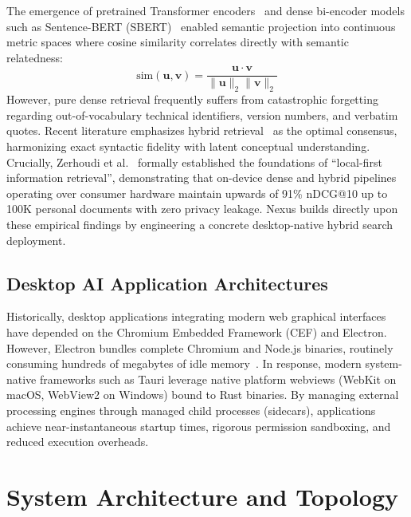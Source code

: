 \documentclass[pdflatex,sn-mathphys-num]{sn-jnl}%
\theoremstyle{thmstyleone}%
\theoremstyle{thmstyletwo}%
\theoremstyle{thmstylethree}%
\begin{document}
The emergence of pretrained Transformer encoders~\cite{devlin2018bert} and dense bi-encoder models such as Sentence-BERT (SBERT)~\cite{reimers2019sentence} enabled semantic projection into continuous metric spaces where cosine similarity correlates directly with semantic relatedness:
\begin{equation}
\text{sim}(\mathbf{u}, \mathbf{v}) = \frac{\mathbf{u} \cdot \mathbf{v}}{\|\mathbf{u}\|_2 \|\mathbf{v}\|_2}\label{eq_cosine}
\end{equation}
However, pure dense retrieval frequently suffers from catastrophic forgetting regarding out-of-vocabulary technical identifiers, version numbers, and verbatim quotes. Recent literature emphasizes hybrid retrieval~\cite{karpukhin2020dense,lin2021pretrained} as the optimal consensus, harmonizing exact syntactic fidelity with latent conceptual understanding. Crucially, Zerhoudi et al.~\cite{zerhoudi2026aswemaysearch} formally established the foundations of ``local-first information retrieval'', demonstrating that on-device dense and hybrid pipelines operating over consumer hardware maintain upwards of 91\% nDCG@10 up to 100K personal documents with zero privacy leakage. Nexus builds directly upon these empirical findings by engineering a concrete desktop-native hybrid search deployment.

\subsection{Desktop AI Application Architectures}\label{subsec2_2}
Historically, desktop applications integrating modern web graphical interfaces have depended on the Chromium Embedded Framework (CEF) and Electron. However, Electron bundles complete Chromium and Node.js binaries, routinely consuming hundreds of megabytes of idle memory~\cite{tauri2023docs}. In response, modern system-native frameworks such as Tauri leverage native platform webviews (WebKit on macOS, WebView2 on Windows) bound to Rust binaries. By managing external processing engines through managed child processes (sidecars), applications achieve near-instantaneous startup times, rigorous permission sandboxing, and reduced execution overheads.

\section{System Architecture and Topology}\label{sec3}
\end{document}
